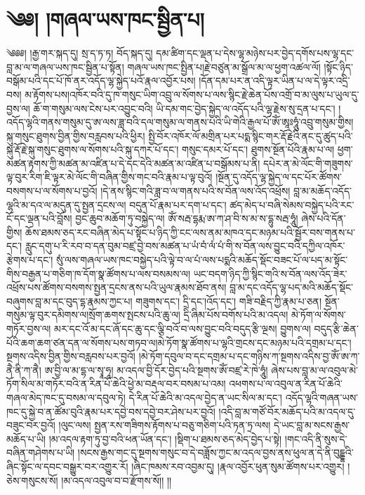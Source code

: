 \setcounter{footnote}{0} 
\chapter{༄༅། །གཞལ་ཡས་ཁང་སྦྱིན་པ།}༄༅༅། །རྒྱ་གར་སྐད་དུ། སྲ་ད་ཏ་ཏ། བོད་སྐད་དུ། དམ་ཚིག་དང་ལྡན་པ་དེས་ལྷ་མཉེས་པར་བྱེད་དགོས་པས་ལྷ་དང་བླ་མ་ལ་གཞལ་ཡས་ཁང་སྦྱིན་པ་སྟོན། གཞལ་ཡས་ཁང་སྤྱིན་པ།རྗེ་བཙུན་མ་སྒྲོལ་མ་ལ་ཕྱག་འཚལ་ལོ། །སྟོང་ཉིད་བསྒོམ་པའི་དང་པོ་ཁོ་ནར་འདོད་ལྷ་སྐྱེད་པའོ་རྣལ་འབྱོར་པས། །དོན་དམ་པར་ན་འདི་ལྟར་ཡིན་པ་ལ་དེ་ལྟར་འདྲི་བས། མ་རྟོགས་པས།འཁོར་བའི་དུ་ཁ་གསུང་ཡིག་འབྲུ་ལ་སོགས་པ་ལས་སྙིང་རྗེ་ཆེན་པོས་འགྲོ་བ་མ་ལུས་པ་ཡུལ་དུ་བྱས་ལ། ཆོ་ག་གསུམ་ལས་ངེས་པར་འབྱུང་བའི། ཡི་དམ་གང་བྱེད་སྐྱེད་ལ་འདོད་པའི་ལྷ་རྗེས་སུ་དྲན་པ་དང་། །འདོད་ལྷའི་གནས་གསུམ་དུ་ཨ་ལས་ཟླ་བའི་དལ་གསུམ་ལ་གནས་པའི་ཡི་གེའི་རྒྱལ་པོ་ཨོཾ་ཨཱཿཧཱུཾ་འབྲུ་གསུམ་གྱིས། སྐུ་གསུང་ཐུགས་བྱིན་གྱིས་བརླབས་པའི་ཕྱིར། སྤྱི་བོར་འཁོར་ལོ་མགྲིན་པར་པདྨ་སྙིང་གར་རྡོ་རྗེའི་ནང་དུ་ཚུད་པའི་སྐུ་རྡོ་རྗེ་སྐུ་གསུང་ཐུགས་ལ་སོགས་པའི་སྐུ་དཀར་པོ་དང་། གསུང་དམར་པོ་དང་། ཐུགས་སྔོན་པོའི་རྣམ་པ་ལ། ཕྱག་མཚན་རྟགས་ཀྱི་མཚན་མ་འཛིན་པ་དེ་དང་དེའི་མཚན་མ་འཛིན་པ་བསྒོམས་པ་ནི། དཔེར་ན་མེ་ལོང་གི་གཟུགས་ལྟ་བུར་རིག་ཇི་ལྟར་མེ་ལོང་གི་བཞིན་གྱིས་གང་བའི་རྣམ་པ་ལྟ་བུའོ། །སྔོན་དུ་འདོད་ལྷ་སྐྱེད་ལ་དང་པོར་ཚོགས་བསགས་པ་ལ་སོགས་པ་བྱའོ། །དེ་ནས་སྙིང་གའི་ཟླ་བ་ལ་གནས་པའི་ས་བོན་ལས་འོད་འཕྲོས། བླ་མ་མཆོད་འདོད་ལྷའི་མ་དའ་ལ་མདུན་དུ་སྤྱན་དྲངས་ལ། བདུན་པོ་རྣམ་པར་དག་པ་དང་། ཚད་མེད་པ་བཞི་སེམས་བསྐྱེད་པའི་རང་ངོ་དང་ལྡན་པའི་བློས། བྱང་ཆུབ་མཆོག་ཏུ་བསྐྱེད་ལ། ཨོཾ་སརྦ་དྷརྨ་ཨ་ཀ་ཤ་བི་ས་མ་ས་དྷུ་སརྦ་ཧཱུཾ། ཞེས་པའི་དོན་གྱིས། ཆོས་ཐམས་ཅད་རང་བཞིན་མེད་པ་སྟོང་པ་ཉིད་ཀྱི་ངང་ལས་ནམ་མཁའ་དང་མཉམ་པའི་སྦྱོར་བས་གནས་པ་དང་། རླུང་དགུ་པ་རི་རབ་བ་དན་བུམ་བཛྲ་བྱེ་བས་མཚན་པ་ཡཾ་བཾ་ལཾ་པཾ་གི་ས་བོན་ལས་བྱུང་བའི་དཀྱིལ་འཁོར་རྩེགས་པ་དང་། སུཾ་ལས་གཞལ་ཡས་ཁང་བསྐྱེད་པའི་ལྟེ་བ་ལ་པཾ་ལས་པདྨའི་མཆོད་སྡོང་བཟང་པོ་ལ་པད་མ་སྟོང་གིས་བརྒྱན་པ་གཅིག་ཁ་དོག་སྣ་ཚོགས་པ་ལས་བསམས་ལ། ཡང་བདག་ཉིད་ཀྱི་སྙིང་གའི་ས་བོན་ལས་འོད་ཟེར་འཕྲོས་པས་ཚོགས་བསགས་སྤྱན་དྲངས་ནས་པའི་ཡུལ་རྣམས་ཐོབ་ནས། བླ་མ་དང་འདོད་ལྷ་པད་མའི་མཆོད་སྡོང་བཞུགས་བླ་མ་དང་བུད་དྷ་རྣམས་ཀྱང་པ། གཟུགས་དང་། དྲི་དང་།འོད་དང་། གཟི་བརྗིད་ཀྱི་རྣམ་པ་ཅན། སྔོན་གསུམ་ལྟ་བུར་དམིགས་ལ།སྲོག་ཆགས་སྤངས་པའི་ཆུ་ལ། དྲི་ཞིམ་པོས་བགོས་པའི་མ་འདལ། མེ་ཏོག་ལ་སོགས་གཏོར་བྱས་ལ། མར་དང་འོ་མ་དང་ཞོ་དང་ཆུ་དང་ལྕི་བའོ་བ་ལས་བྱུང་བའི་བདུད་རྩི་ལྔས། བྱུགས་ལ། བདུད་རྩི་ཆེན་པོའི་ཆག་ཆག་ཙན་དན་ལ་སོགས་པས་གཏབ་ལ།མེ་ཏོག་སྣ་ཚོགས་པ་ལྷའི་གྲངས་དང་མཉམ་པའི་དགྲམ་པ་དང་། སྔགས་འདིས་བྱིན་གྱིས་བརླབས་པར་བྱའོ། །མེ་ཏོག་དབུལ་བ་དང་དགྲམ་པ་དང་གཉིས་ཀ་སྔགས་འདིས་བྱ་ཨོཾ་ཨ་ཀ་ནཻ་ནི་ཀ་ནཻ། ཨ་བྱི་ལ་མ་དྷ་ལ་སྭཱ་ཧཱ། མ་འདལ་བྱི་དོར་བྱེད་པའི་སྔགས་ཨོཾ་བཛྲ་རེ་ཁེ་ཧཱུཾ། ཞེས་པས་བླ་མ་ལ་འབུལ་མེ་ཏོག་སིལ་མ་གཏོར་བའི་ན་རིན་པོ་ཆེའི་ཕྱེ་མ་བརྡལ་བར་བསམ་པ་འམ། འཕགས་པ་ལ་འབུལ་ན་རིན་པོ་ཆེའི་གཞལ་མེད་ཁང་དུ་བསམ་ལ་དབུལ་ཏེ། དེ་རིན་པོ་ཆེའི་མ་འདལ་བྱེད་ན་ཡང་སིལ་མ་དང་། འདོད་ལྷའི་གཞན་ཡས་ཁང་དུ་སྐྱེ་བ་ན་ཚོམ་བུའི་རྣམ་པར་དབྱེ་བས་དབྱེ་བར་ཤེས་པར་བྱའོ། །འདི་བླ་མ་གཙོ་བོར་མཆོད་པའི་མ་འདལ་དུ་བཟུང་བར་བྱའོ། །ལུང་ལས། སྤྱན་རས་གཟིགས་རྟོགས་པ་བཅུ་གཅིག་པའི་ཏན་ཏྲ་ལས། དེ་ཡང་བླ་མ་སངས་རྒྱས་མཆོད་པ་ཡི། །མ་འདལ་རྟག་ཏུ་བྱ་བའི་ཕན་ཡོན་དང་། །སྡིག་པ་ཐམས་ཅད་མེད་བྱེད་པ་སྟེ། །གང་འདི་ནི་སུས་དེ་བཞིན་གཤེགས་པ་ཡི། །སངས་རྒྱས་གང་དུ་སྔགས་གསུང་བ་དེ་བཟློས་ཀྱང་མ་འདལ་བྱས་ནས་ཕུལ་ན་དེ་ནི་བུངྡྷའི་ཞིང་སྟོང་ལ་དབང་བསྒྱུར་བར་འགྱུར་རོ། །ཞིང་ཁམས་རབ་འབྱམ་དུ། །རྣལ་འབྱོར་ཕུན་སུམ་ཚོགས་པར་འགྱུར། །ཅེས་གསུངས་སོ། །མ་འདལ་འབུལ་བ་བ་རྫོགས་སོ།། །།